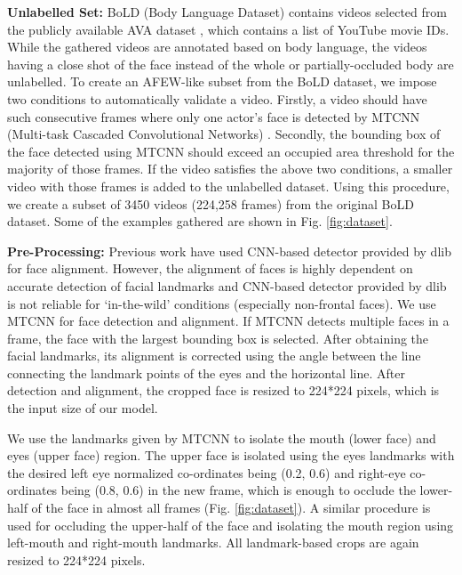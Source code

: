 \documentclass[runningheads]{llncs}
\begin{document}
\noindent\textbf{Unlabelled Set:} BoLD (Body Language Dataset) \cite{luo2020arbee} contains videos selected from the publicly available AVA dataset \cite{gu2018ava}, which contains a list of YouTube movie IDs. While the gathered videos are annotated based on body language, the videos having a close shot of the face instead of the whole or partially-occluded body are unlabelled. To create an AFEW-like subset from the BoLD dataset, we impose two conditions to automatically validate a video. Firstly, a video should have  such consecutive frames where only one actor's face is detected by MTCNN (Multi-task Cascaded Convolutional Networks) \cite{zhang2016joint}. Secondly, the bounding box of the face detected using MTCNN should exceed an occupied area threshold for the majority of those  frames. If the video satisfies the above two conditions, a smaller video with those  frames is added to the unlabelled dataset. Using this procedure, we create a subset of 3450 videos (224,258 frames) from the original BoLD dataset. Some of the examples gathered are shown in Fig. \ref{fig:dataset}. \newline


\noindent\textbf{Pre-Processing:} \label{sec: preprocess}
Previous work \cite{lu2018multiple,meng2019frame} have used CNN-based detector provided by dlib \cite{king2009dlib} for face alignment. However, the alignment of faces is highly dependent on accurate detection of facial landmarks and CNN-based detector provided by dlib is not reliable for `in-the-wild' conditions (especially non-frontal faces). We use MTCNN \cite{zhang2016joint} for face detection and alignment. If MTCNN detects multiple faces in a frame, the face with the largest bounding box is selected. After obtaining the facial landmarks, its alignment is corrected using the angle between the line connecting the landmark points of the eyes and the horizontal line. After detection and alignment, the cropped face is resized to 224*224 pixels, which is the input size of our model. 

We use the landmarks given by MTCNN to isolate the mouth (lower face) and eyes (upper face) region. The upper face is isolated using the eyes landmarks with the desired left eye normalized co-ordinates being (0.2, 0.6) and right-eye co-ordinates being (0.8, 0.6) in the new frame, which is enough to occlude the lower-half of the face in almost all frames (Fig. \ref{fig:dataset}). A similar procedure is used for occluding the upper-half of the face and isolating the mouth region using left-mouth and right-mouth landmarks. All landmark-based crops are again resized to 224*224 pixels.
\end{document}
